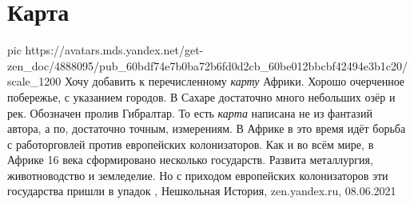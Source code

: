 
 
 
 
 
\chapter{Карта}

\ifcmt
  pic https://avatars.mds.yandex.net/get-zen_doc/4888095/pub_60bdf74e7b0ba72b6fd0d2cb_60be012bbcbf42494e3b1c20/scale_1200
\fi
Хочу добавить к перечисленному \emph{карту} Африки. Хорошо очерченное
побережье, с указанием городов.  В Сахаре достаточно много небольших озёр и
рек. Обозначен пролив Гибралтар.  То есть \emph{карта} написана не из фантазий
автора, а по, достаточно точным, измерениям.  В Африке в это время идёт борьба
с работорговлей против европейских колонизаторов. Как и во всём мире, в Африке
16 века сформировано несколько государств. Развита металлургия, животноводство
и земледелие.  Но с приходом европейских колонизаторов эти государства пришли в
упадок
, 
Нешкольная История, zen.yandex.ru, 08.06.2021
